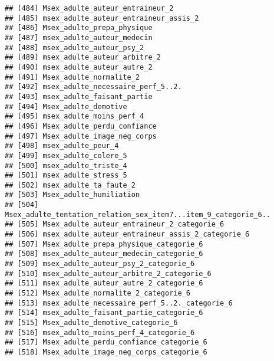\documentclass[
]{article}
\begin{document}
\begin{verbatim}
## [484] Msex_adulte_auteur_entraineur_2                                  
## [485] msex_adulte_auteur_entraineur_assis_2                            
## [486] Msex_adulte_prepa_physique                                       
## [487] msex_adulte_auteur_medecin                                       
## [488] msex_adulte_auteur_psy_2                                         
## [489] msex_adulte_auteur_arbitre_2                                     
## [490] msex_adulte_auteur_autre_2                                       
## [491] Msex_adulte_normalite_2                                          
## [492] msex_adulte_necessaire_perf_5..2.                                
## [493] msex_adulte_faisant_partie                                       
## [494] Msex_adulte_demotive                                             
## [495] msex_adulte_moins_perf_4                                         
## [496] Msex_adulte_perdu_confiance                                      
## [497] Msex_adulte_image_neg_corps                                      
## [498] msex_adulte_peur_4                                               
## [499] msex_adulte_colere_5                                             
## [500] msex_adulte_triste_4                                             
## [501] msex_adulte_stress_5                                             
## [502] msex_adulte_ta_faute_2                                           
## [503] Msex_adulte_humiliation                                          
## [504] Msex_adulte_tentation_relation_sex_item7...item_9_categorie_6..  
## [505] Msex_adulte_auteur_entraineur_2_categorie_6                      
## [506] msex_adulte_auteur_entraineur_assis_2_categorie_6                
## [507] Msex_adulte_prepa_physique_categorie_6                           
## [508] msex_adulte_auteur_medecin_categorie_6                           
## [509] msex_adulte_auteur_psy_2_categorie_6                             
## [510] msex_adulte_auteur_arbitre_2_categorie_6                         
## [511] msex_adulte_auteur_autre_2_categorie_6                           
## [512] Msex_adulte_normalite_2_categorie_6                              
## [513] msex_adulte_necessaire_perf_5..2._categorie_6                    
## [514] msex_adulte_faisant_partie_categorie_6                           
## [515] Msex_adulte_demotive_categorie_6                                 
## [516] msex_adulte_moins_perf_4_categorie_6                             
## [517] Msex_adulte_perdu_confiance_categorie_6                          
## [518] Msex_adulte_image_neg_corps_categorie_6                          

\end{verbatim}
\end{document}
